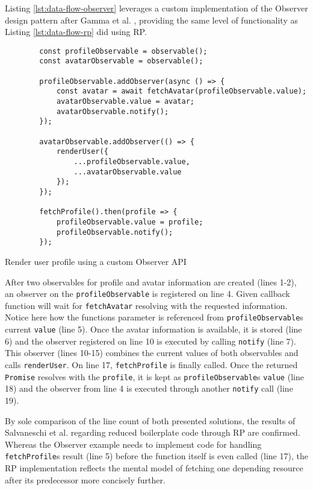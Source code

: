 \documentclass[12pt,a4paper]{article}
\begin{document}
Listing \ref{lst:data-flow-observer} leverages a custom implementation of the Observer design pattern after Gamma et al. \cite{gamma1995design}, providing the same level of functionality as Listing \ref{lst:data-flow-rp} did using RP.

\begin{listing}[H]
	\begin{verbatim}
		const profileObservable = observable();
		const avatarObservable = observable();

		profileObservable.addObserver(async () => {
			const avatar = await fetchAvatar(profileObservable.value);
			avatarObservable.value = avatar;
			avatarObservable.notify();
		});

		avatarObservable.addObserver(() => {
			renderUser({
				...profileObservable.value,
				...avatarObservable.value
			});
		});

		fetchProfile().then(profile => {
			profileObservable.value = profile;
			profileObservable.notify();
		});
	\end{verbatim}
	\caption{Render user profile using a custom Observer API}
	\label{lst:data-flow-observer}
\end{listing}

After two observables for profile and avatar information are created (lines 1-2), an observer on the \texttt{profileObservable} is registered on line 4. Given callback function will wait for \texttt{fetchAvatar} resolving with the requested information. Notice here how the functions parameter is referenced from \texttt{profileObservable}s current \texttt{value} (line 5). Once the avatar information is available, it is stored (line 6) and the observer registered on line 10 is executed by calling \texttt{notify} (line 7). This observer (lines 10-15) combines the current values of both observables and calls \texttt{renderUser}. On line 17, \texttt{fetchProfile} is finally called. Once the returned \texttt{Promise} resolves with the \texttt{profile}, it is kept as \texttt{profileObservable}s \texttt{value} (line 18) and the observer from line 4 is executed through another \texttt{notify} call (line 19).

By sole comparison of the line count of both presented solutions, the results of Salvaneschi et al. \cite{7827078} regarding reduced boilerplate code through RP are confirmed. Whereas the Observer example needs to implement code for handling \texttt{fetchProfile}s result (line 5) before the function itself is even called (line 17), the RP implementation reflects the mental model of fetching one depending resource after its predecessor more concisely further.
\end{document}
